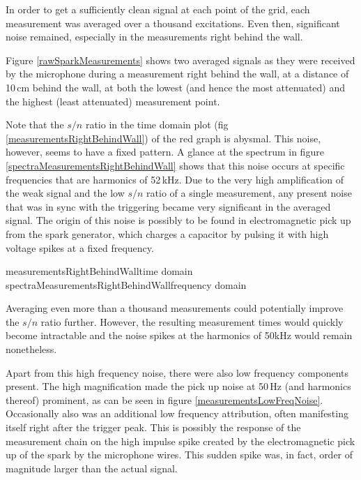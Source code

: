 In order to get a sufficiently clean signal at each point of the grid, each measurement was averaged over a thousand excitations. Even then, significant noise remained, especially in the measurements right behind the wall.

Figure \ref{rawSparkMeasurements} shows two averaged signals as they were received by the microphone during a measurement right behind the wall, at a distance of 10\,cm behind the wall, at both the lowest (and hence the most attenuated) and the highest (least attenuated) measurement point.

Note that the $s/n$ ratio in the time domain plot (fig \ref{measurementsRightBehindWall}) of the red graph is abysmal. This noise, however, seems to have a fixed pattern. A glance at the spectrum in figure \ref{spectraMeasurementsRightBehindWall} shows that this noise occurs at specific frequencies that are harmonics of 52\,kHz. Due to the very high amplification of the weak signal and the low $s/n$ ratio of a single measurement, any present noise that was in sync with the triggering became very significant in the averaged signal. The origin of this noise is possibly to be found in electromagnetic pick up from the spark generator, which charges a capacitor by pulsing it with high voltage spikes at a fixed frequency.


	{measurementsRightBehindWall}{time domain}
	{spectraMeasurementsRightBehindWall}{frequency domain}

Averaging even more than a thousand measurements could potentially improve the $s/n$ ratio further. However, the resulting measurement times would quickly become intractable and the noise spikes at the harmonics of 50kHz would remain nonetheless.

Apart from this high frequency noise, there were also low frequency components present. The high magnification made the pick up noise at 50\,Hz (and harmonics thereof) prominent, as can be seen in figure \ref{measurementsLowFreqNoise}. Occasionally also was an additional low frequency attribution, often manifesting itself right after the trigger peak. This is possibly the response of the measurement chain on the high impulse spike created by the electromagnetic pick up of the spark by the microphone wires. This sudden spike was, in fact, order of magnitude larger than the actual signal.

